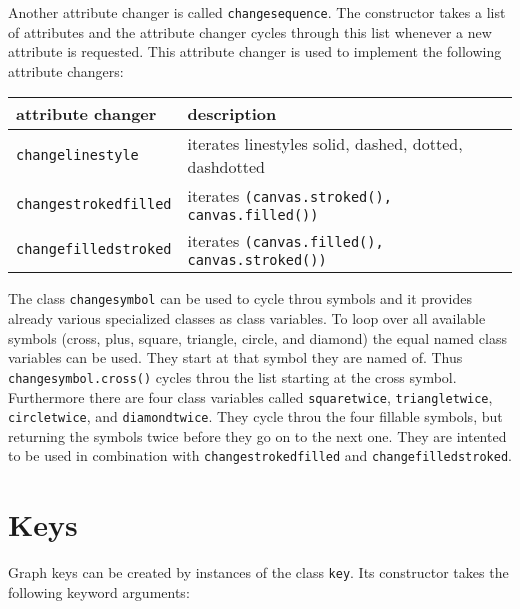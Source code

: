 Another attribute changer is called \verb|changesequence|. The
constructor takes a list of attributes and the attribute changer
cycles through this list whenever a new attribute is requested.
This attribute changer is used to implement the following attribute
changers:

\begin{center}
\begin{tabular}{ll}
attribute changer&description\\
\hline
\texttt{changelinestyle}&iterates linestyles solid, dashed, dotted, dashdotted\\
\texttt{changestrokedfilled}&iterates \texttt{(canvas.stroked(), canvas.filled())}\\
\texttt{changefilledstroked}&iterates \texttt{(canvas.filled(), canvas.stroked())}\\
\end{tabular}
\end{center}

The class \verb|changesymbol| can be used to cycle throu symbols and it
provides already various specialized classes as class variables. To
loop over all available symbols (cross, plus, square, triangle,
circle, and diamond) the equal named class variables can be used. They
start at that symbol they are named of. Thus \verb|changesymbol.cross()|
cycles throu the list starting at the cross symbol. Furthermore
there are four class variables called \verb|squaretwice|,
\verb|triangletwice|, \verb|circletwice|, and \verb|diamondtwice|.
They cycle throu the four fillable symbols, but returning the symbols
twice before they go on to the next one. They are intented to be used
in combination with \verb|changestrokedfilled| and
\verb|changefilledstroked|.

\section{Keys}

Graph keys can be created by instances of the class \verb|key|. Its
constructor takes the following keyword arguments:

